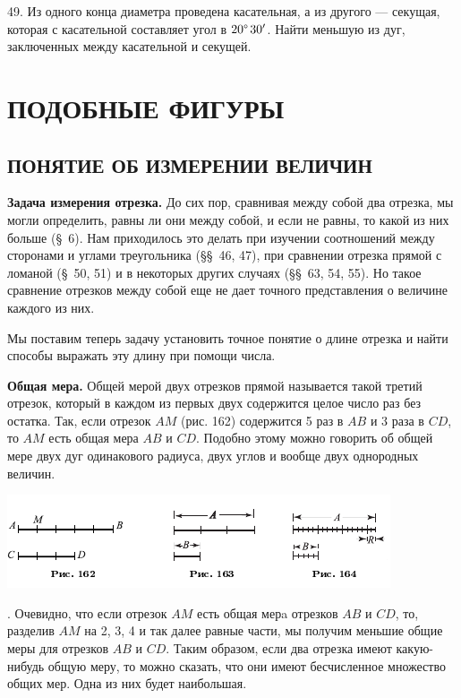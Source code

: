 \documentclass[oneside]{book}
\begin{document}
49.
Из одного конца диаметра проведена касательная, а из другого — секущая, которая с касательной составляет угол в $20\degree\,30'$.
Найти меньшую из дуг, заключенных между касательной и секущей.

\chapter{ПОДОБНЫЕ ФИГУРЫ}

\section{ПОНЯТИЕ ОБ ИЗМЕРЕНИИ ВЕЛИЧИН}

\textbf{Задача измерения отрезка.}
До сих пор, сравнивая между собой два отрезка, мы могли определить, равны ли они между собой, и если не равны, то какой из них больше (§~6).
Нам приходилось это делать при изучении соотношений между сторонами и углами треугольника (§§~46, 47), при сравнении отрезка прямой с ломаной (§~50, 51) и в некоторых других случаях (§§~63, 54, 55).
Но такое сравнение отрезков между собой еще не дает точного представления о величине каждого из них.

Мы поставим теперь задачу установить точное понятие о длине отрезка и найти способы выражать эту длину при помощи числа.

\textbf{Общая мера.}
Общей мерой двух отрезков прямой называется такой третий отрезок, который в каждом из первых двух содержится целое число раз без остатка.
Так, если отрезок $AM$ (рис. 162) содержится 5 раз в $AB$ и 3 раза в $CD$, то $AM$ есть общая мера $AB$ и $CD$.
Подобно этому можно говорить об общей мере двух дуг одинакового радиуса, двух углов и вообще двух однородных величин.

\includegraphics{pics/ris-162-164}

.
Очевидно, что если отрезок $AM$ есть общая мерa
отрезков $AB$ и $CD$, то, разделив $AM$ на 2, 3, 4 и так далее равные
части, мы получим меньшие общие меры для отрезков $AB$ и $CD$.
Таким образом, если два отрезка имеют какую-нибудь общую меру, то можно сказать, что они имеют бесчисленное множество общих мер.
Одна из них будет наибольшая.
\end{document}
